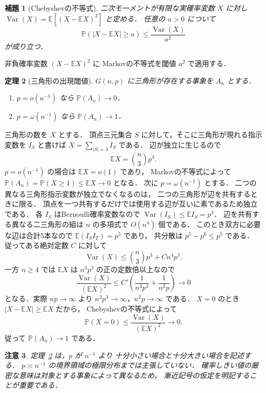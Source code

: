 \documentclass[a5paper,10pt,onecolumn]{jsarticle}
\makeatletter
\theoremstyle{mathnotetheorem}
\newtheorem{theorem}{定理}[section]
\newtheorem{lemma}[theorem]{補題}
\newtheorem{remark}[theorem]{注意}
\renewcommand{\proofname}{証明}
\renewenvironment{proof}[1][\proofname]{%
  \par\pushQED{\qed}\normalfont\topsep4\p@\@plus2\p@\relax
  \trivlist\item[\hskip\labelsep\bfseries #1]\ignorespaces
}{\popQED\endtrivlist\@endpefalse}
\makeatother
\begin{document}
\begin{lemma}[Chebyshevの不等式]\label{lem:chebyshev}
二次モーメントが有限な実確率変数 $X$ に対し
$\operatorname{Var}(X)=\mathbb E[(X-\mathbb EX)^2]$ と定める．
任意の $a>0$ について
\[
 \mathbb P(|X-\mathbb EX|\ge a)
 \le\frac{\operatorname{Var}(X)}{a^2}
\]
が成り立つ．
\end{lemma}
\begin{proof}
非負確率変数 $(X-\mathbb EX)^2$ に
Markovの不等式を閾値 $a^2$ で適用する．
\end{proof}

\begin{theorem}[三角形の出現閾値]\label{thm:trianglethreshold}
$G(n,p)$ に三角形が存在する事象を $A_n$ とする．
\begin{enumerate}
\item $p=o(n^{-1})$ なら $\mathbb P(A_n)\to0$．
\item $p=\omega(n^{-1})$ なら $\mathbb P(A_n)\to1$．
\end{enumerate}
\end{theorem}
\begin{proof}
三角形の数を $X$ とする．
頂点三元集合 $S$ に対して，そこに三角形が現れる指示変数を $I_S$ と書けば
$X=\sum_{|S|=3}I_S$ である．
辺が独立に生じるので
\[
 \mathbb EX={n\choose3}p^3.
\]
$p=o(n^{-1})$ の場合は $\mathbb EX=o(1)$ であり，
Markovの不等式によって
$\mathbb P(A_n)=\mathbb P(X\ge1)\le\mathbb EX\to0$ となる．
次に $p=\omega(n^{-1})$ とする．
二つの異なる三角形指示変数が独立でなくなるのは，
二つの三角形が辺を共有するときに限る．
頂点を一つ共有するだけでは使用する辺が互いに素であるため独立である．
各 $I_S$ はBernoulli確率変数なので
$\operatorname{Var}(I_S)\le\mathbb EI_S=p^3$．
辺を共有する異なる二三角形の組は
$n$ の多項式で $O(n^4)$ 個である．
このとき双方に必要な辺は合計5本なので
$\mathbb E(I_SI_T)=p^5$ であり，
共分散は $p^5-p^6\le p^5$ である．
従ってある絶対定数 $C$ に対して
\[
 \operatorname{Var}(X)
 \le {n\choose3}p^3+Cn^4p^5.
\]
一方 $n\ge4$ では $\mathbb EX$ は $n^3p^3$ の正の定数倍以上なので
\[
 \frac{\operatorname{Var}(X)}{(\mathbb EX)^2}
 \le C'\left(\frac1{n^3p^3}+\frac1{n^2p}\right)
 \longrightarrow0
\]
となる．実際 $np\to\infty$ より
$n^3p^3\to\infty$，$n^2p\to\infty$ である．
$X=0$ のとき $|X-\mathbb EX|\ge\mathbb EX$ だから，
Chebyshevの不等式によって
\[
 \mathbb P(X=0)
 \le\frac{\operatorname{Var}(X)}{(\mathbb EX)^2}\to0.
\]
従って $\mathbb P(A_n)\to1$ である．
\end{proof}

\begin{remark}
定理~\ref{thm:trianglethreshold} は，$p$ が $n^{-1}$ より
十分小さい場合と十分大きい場合を記述する．
$p\asymp n^{-1}$ の境界領域の極限分布までは主張していない．
確率しきい値の厳密な意味は対象とする事象によって異なるため，
漸近記号の仮定を明記することが重要である．
\end{remark}
\end{document}
